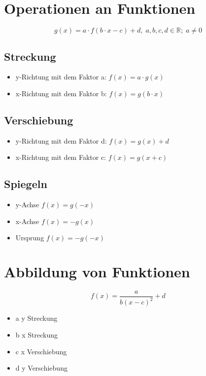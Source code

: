 \documentclass{book}
\begin{document}
\section{Operationen an Funktionen}

\[g(x) = a \cdot f(b\cdot x-c) + d, \; a, b, c, d \in \mathbb{R} ; \; a\not = 0\]

\subsection{Streckung}
\begin{itemize}[-]
\item y-Richtung mit dem Faktor a: $f(x) = a \cdot g(x)$
\item x-Richtung mit dem Faktor b: $f(x) = g(b\cdot x)$

\end{itemize}
\subsection{Verschiebung}

\begin{itemize}[-]
\item y-Richtung mit dem Faktor d: $f(x) = g(x) + d $

\item x-Richtung mit dem Faktor c: $f(x) = g(x+c) $
\end{itemize}

\subsection{Spiegeln}

\begin{itemize}[-]
\item y-Achse $f(x) = g(-x)$
\item x-Achse $f(x) = -g(x)$
\item Ursprung $f(x) = -g(-x)$
\end{itemize}

\section {Abbildung von Funktionen}

\[f(x) = \frac a {b(x-c)^2} +d\]
\begin{itemize}[-]
\item a y Streckung
\item b x Streckung
\item c x Verschiebung
\item d y Verschiebung
\end{itemize}
\end{document}

